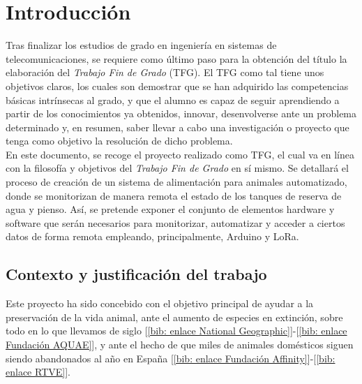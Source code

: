 \documentclass[12pt]{article}
\begin{document}
	\section[Introducción]{Introducción} %
	
	Tras finalizar los estudios de grado en ingeniería en sistemas de telecomunicaciones, se requiere como último paso para la obtención del título la elaboración del \textit{Trabajo Fin de Grado} (TFG). 
	El TFG como tal tiene unos objetivos claros, los cuales son demostrar que se han adquirido las competencias básicas intrínsecas al grado, y que el alumno es capaz de seguir aprendiendo a partir de los conocimientos ya obtenidos, innovar, desenvolverse ante un problema determinado y, en resumen, saber llevar a cabo una investigación o proyecto que tenga como objetivo la resolución de dicho problema. \\
	
	\noindent En este documento, se recoge el proyecto realizado como TFG,  el cual va en línea con la filosofía y objetivos del \textit{Trabajo Fin de Grado} en sí mismo. Se detallará el proceso de creación de un sistema de alimentación para animales automatizado, donde se monitorizan de manera remota el estado de los tanques de reserva de agua y pienso. Así, se pretende exponer el conjunto de elementos hardware y software que serán necesarios para monitorizar, automatizar y acceder a ciertos datos de forma remota empleando, principalmente, Arduino y LoRa.\\
	
	
	\subsection[Contexto y justificación del trabajo]{Contexto y justificación del trabajo}
	\label{subsection: contexto y justificacion}
	
	\noindent Este proyecto ha sido concebido con el objetivo principal de ayudar a la preservación de la vida animal, ante el aumento de especies en extinción, sobre todo en lo que llevamos de siglo [\ref{bib: enlace National Geographic}]-[\ref{bib: enlace Fundación AQUAE}], 
	y ante el hecho de que miles de animales domésticos siguen siendo abandonados al año en España [\ref{bib: enlace Fundación Affinity}]-[\ref{bib: enlace RTVE}]. \\ %
	
\end{document}
